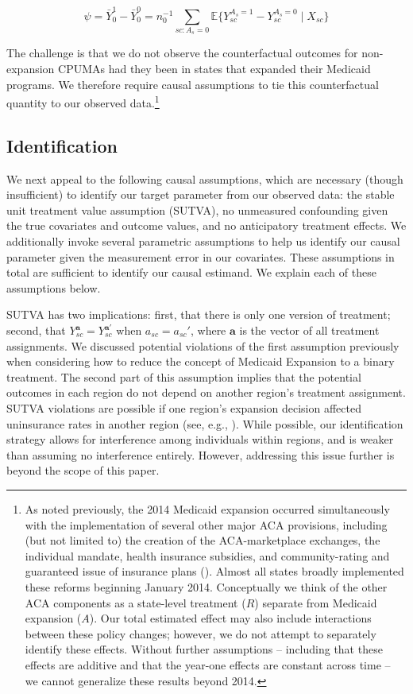 \documentclass[aoas]{imsart}
\theoremstyle{plain}
\theoremstyle{remark}
\begin{document}
\begin{equation}
\psi = \bar{Y}_0^1 - \bar{Y}_0^0 = n_0^{-1}\sum_{sc: A_s = 0} \mathbb{E}\{Y_{sc}^{A_s = 1} - Y_{sc}^{A_s = 0} \mid X_{sc}\} 
\end{equation}

The challenge is that we do not observe the counterfactual outcomes for non-expansion CPUMAs had they been in states that expanded their Medicaid programs. We therefore require causal assumptions to tie this counterfactual quantity to our observed data.\footnote{As noted previously, the 2014 Medicaid expansion occurred simultaneously with the implementation of several other major ACA provisions, including (but not limited to) the creation of the ACA-marketplace exchanges, the individual mandate, health insurance subsidies, and community-rating and guaranteed issue of insurance plans (\cite{courtemanche2017early}). Almost all states broadly implemented these reforms beginning January 2014. Conceptually we think of the other ACA components as a state-level treatment ($R$) separate from Medicaid expansion ($A$). Our total estimated effect may also include interactions between these policy changes; however, we do not attempt to separately identify these effects. Without further assumptions -- including that these effects are additive and that the year-one effects are constant across time -- we cannot generalize these results beyond 2014.} 

\subsection{Identification} \label{ssec:identification}

We next appeal to the following causal assumptions, which are necessary (though insufficient) to identify our target parameter from our observed data: the stable unit treatment value assumption (SUTVA), no unmeasured confounding given the true covariates and outcome values, and no anticipatory treatment effects. We additionally invoke several parametric assumptions to help us identify our causal parameter given the measurement error in our covariates. These assumptions in total are sufficient to identify our causal estimand. We explain each of these assumptions below.

SUTVA has two implications: first, that there is only one version of treatment; second, that $Y_{sc}^{\mathbf{a}} = Y_{sc}^{\mathbf{a}'}$ when $a_{sc} = a_{sc}'$, where $\mathbf{a}$ is the vector of all treatment assignments. We discussed potential violations of the first assumption previously when considering how to reduce the concept of Medicaid Expansion to a binary treatment. The second part of this assumption implies that the potential outcomes in each region do not depend on another region's treatment assignment. SUTVA violations are possible if one region's expansion decision affected uninsurance rates in another region (see, e.g., \cite{frean2017premium}). While possible, our identification strategy allows for interference among individuals within regions, and is weaker than assuming no interference entirely. However, addressing this issue further is beyond the scope of this paper.
\end{document}
